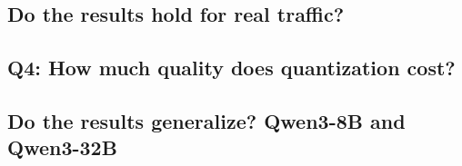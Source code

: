 \subsection{Do the results hold for real traffic?}
\label{sec:real}


\subsection{Q4: How much quality does quantization cost?}
\label{sec:q4}


\subsection{Do the results generalize? Qwen3-8B and Qwen3-32B}
\label{sec:general}

